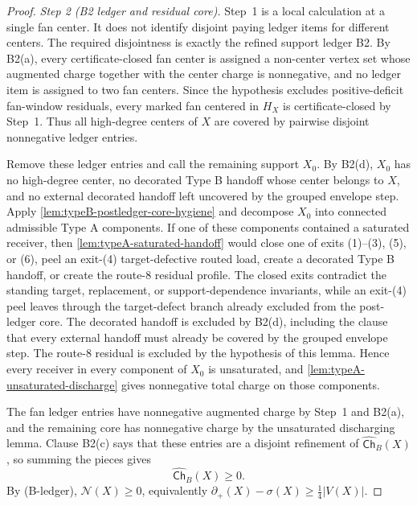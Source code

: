 \documentclass[11pt]{article}
\newcommand{\defp}{\partial_+}
\newcommand{\Ch}{\mathsf{Ch}}
\newcommand{\No}{\mathcal N}
\begin{document}
\begin{proof}
\emph{Step 2 (B2 ledger and residual core).}  Step~1 is a local calculation at a
single fan center.  It does not identify disjoint paying ledger items for different
centers.  The required disjointness is exactly the refined support ledger B2.  By
B2(a), every certificate-closed fan center is assigned a non-center vertex set
whose augmented charge together with the center charge is nonnegative, and no
ledger item is assigned to two fan centers.
Since the hypothesis excludes positive-deficit fan-window residuals, every
marked fan centered in $H_X$ is certificate-closed by Step~1.  Thus all
high-degree centers of $X$ are covered by pairwise disjoint nonnegative ledger
entries.

Remove these ledger entries and call the remaining support $X_0$.  By B2(d),
$X_0$ has no high-degree center, no decorated Type B handoff whose center
belongs to \(X\), and no external decorated handoff left uncovered by the
grouped envelope step.  Apply \cref{lem:typeB-postledger-core-hygiene} and
decompose \(X_0\) into connected admissible Type A components.  If one of
these components contained a saturated receiver, then
\cref{lem:typeA-saturated-handoff} would close one of exits (1)--(3), (5), or
(6), peel an exit-(4) target-defective routed load, create a decorated Type B
handoff, or create the route-8 residual profile.  The closed exits contradict
the standing target, replacement, or support-dependence invariants, while an
exit-(4) peel leaves through the target-defect branch already excluded from the
post-ledger core.
The decorated handoff is excluded by B2(d), including the clause that every
external handoff must already be covered by the grouped envelope step.  The
route-8 residual is excluded by the hypothesis of this
lemma.  Hence every receiver in every component of \(X_0\) is unsaturated, and
\cref{lem:typeA-unsaturated-discharge} gives nonnegative total charge on those
components.

The fan ledger entries have nonnegative augmented charge by Step~1 and B2(a),
and the remaining core has nonnegative charge by the unsaturated discharging
lemma.  Clause B2(c) says that these entries are a disjoint refinement of
$\widehat{\Ch}_B(X)$, so summing the pieces gives
\[
\widehat{\Ch}_B(X)\ge0 .
\]
By \textup{(B-ledger)}, $\No(X)\ge0$, equivalently
$\defp(X)-\sigma(X)\ge\frac14|V(X)|$.
\end{proof}
\end{document}
